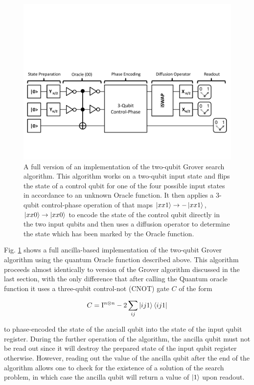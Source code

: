 \begin{figure}[ht!]
	\centering
		\includegraphics[width=1\textwidth]{./material/papers/grover/quantum_algorithm_full}
	\caption[Full version of an implementation of the two-qubit Grover search algorithm]{A full version of an implementation of the two-qubit Grover search algorithm. This algorithm works on a two-qubit input state and flips the state of a control qubit for one of the four possible input states in accordance to an unknown Oracle function. It then applies a 3-qubit control-phase operation of that maps $\left| xx1 \right>\to -\left| xx1 \right>$, $\left| xx0 \right>\to\left| xx0 \right>$ to encode the state of the control qubit directly in the two input qubits and then uses a diffusion operator to determine the state which has been marked by the Oracle function.}
	\label{fig:GroverAlgorithmFullSchematic}
\end{figure}

\smallskip

Fig. \ref{fig:GroverAlgorithmFullSchematic} shows a full ancilla-based implementation of the two-qubit Grover algorithm using the quantum Oracle function described above. This algorithm proceeds almost identically to version of the Grover algorithm discussed in the last section, with the only difference that after calling the Quantum oracle function it uses a three-qubit control-not (CNOT) gate $C$ of the form

\begin{equation}
C = \mathrm{I}^{n\otimes n}-2\sum\limits_{ij} \left| ij1 \right>\left< ij1 \right|
\end{equation}

to phase-encoded the state of the anciall qubit into the state of the input qubit register. During the further operation of the algorithm, the ancilla qubit must not be read out since it will destroy the prepared state of the input qubit register otherwise. However, reading out the value of the ancilla qubit after the end of the algorithm allows one to check for the existence of a solution of the search problem, in which case the ancilla qubit will return a value of $\left| 1 \right>$ upon readout.

